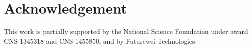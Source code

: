 \section*{Acknowledgement}
This work is partially supported by the National Science Foundation under award CNS-1345318 and CNS-1455850, and by Futurewei Technologies.